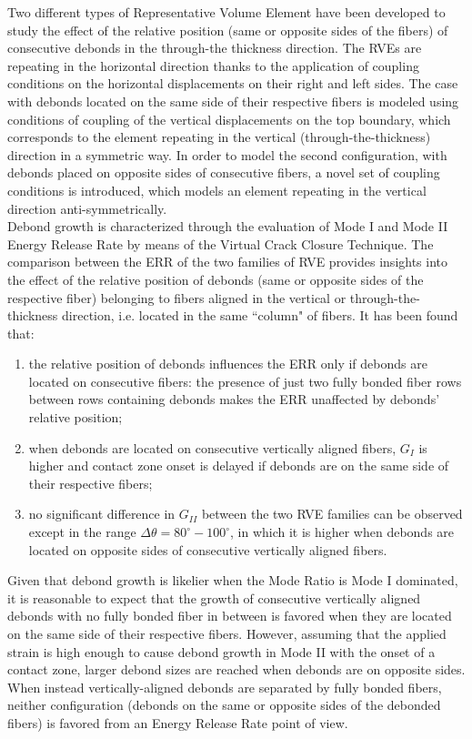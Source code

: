 Two different types of Representative Volume Element have been developed to study the effect of the relative position (same or opposite sides of the fibers) of consecutive debonds in the through-the thickness direction. The RVEs are repeating in the horizontal direction thanks to the application of coupling conditions on the horizontal displacements on their right and left sides. The case with debonds located on the same side of their respective fibers is modeled using conditions of coupling of the vertical displacements on the top boundary, which corresponds to the element repeating in the vertical (through-the-thickness) direction in a symmetric way. In order to model the second configuration, with debonds placed on opposite sides of consecutive fibers, a novel set of coupling conditions is introduced, which models an element repeating in the vertical direction anti-symmetrically.\\
Debond growth is characterized through the evaluation of Mode I and Mode II Energy Release Rate by means of the Virtual Crack Closure Technique. The comparison between the ERR of the two families of RVE provides insights into the effect of the relative position of debonds (same or opposite sides of the respective fiber) belonging to fibers aligned in the vertical or through-the-thickness direction, i.e. located in the same ``column" of fibers. It has been found that:

\begin{enumerate}
\item the relative position of debonds influences the ERR only if debonds are located on consecutive fibers: the presence of just two fully bonded fiber rows between rows containing debonds makes the ERR unaffected by debonds’ relative position; 
\item when debonds are located on consecutive vertically aligned fibers, $G_{I}$  is higher and contact zone onset is delayed if debonds are on the same side of their respective fibers; 
\item no significant difference in $G_{II}$ between the two RVE families can be observed except in the range $\Delta\theta=80^{\circ}-100^{\circ}$, in which it is higher when debonds are located on opposite sides of consecutive vertically aligned fibers. 
\end{enumerate}

Given that debond growth is likelier when the Mode Ratio is Mode I dominated, it is reasonable to expect that the growth of consecutive vertically aligned debonds with no fully bonded fiber in between is favored when they are located on the same side of their respective fibers. However, assuming that the applied strain is high enough to cause debond growth in Mode II with the onset of a contact zone, larger debond sizes are reached when debonds are on opposite sides. When instead vertically-aligned debonds are separated by fully bonded fibers, neither configuration (debonds on the same or opposite sides of the debonded fibers) is favored from an Energy Release Rate point of view. 

